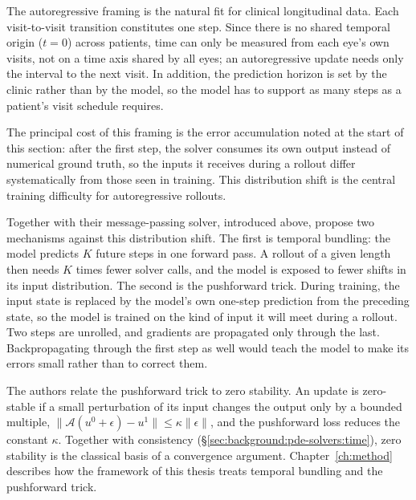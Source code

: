 The autoregressive framing is the natural fit for clinical
longitudinal data. Each visit-to-visit transition constitutes one step. Since there is no
shared temporal origin ($t = 0$) across patients, time can only be
measured from each eye's own visits, not on a time axis shared by all
eyes; an autoregressive update needs only the interval to the next visit.
In addition, the prediction horizon
is set by the clinic rather than by the model, so the model has to
support as many steps as a patient's visit schedule requires.

The principal cost of this framing is the error accumulation noted at
the start of this section: after the first step, the solver consumes its
own output instead of numerical ground truth, so the inputs it receives
during a rollout differ systematically from those seen in training. This
distribution shift is the central training
difficulty for autoregressive rollouts.

Together with their message-passing solver, introduced above,
\citet{Brandstetter2022} propose two mechanisms against this distribution
shift.
The first is temporal bundling: the model predicts $K$ future steps in
one forward pass. A rollout of a given length then needs $K$ times fewer
solver calls, and the model is exposed to fewer shifts in its input
distribution. The second is the pushforward trick. During training, the
input state is replaced by the model's own one-step prediction from the
preceding state, so the model is trained on the kind of input it will
meet during a rollout. Two steps are unrolled, and gradients are
propagated only through the last. Backpropagating through the first step
as well would teach the model to make its errors small rather than to
correct them.

The authors relate the pushforward trick to zero stability. An update
is zero-stable if a small perturbation of its input changes the
output only by a bounded multiple,
$\lVert \mathcal{A}(u^0 + \epsilon) - u^1 \rVert \leq \kappa \lVert
\epsilon \rVert$, and the pushforward loss reduces the constant
$\kappa$. Together with consistency
(\S\ref{sec:background:pde-solvers:time}), zero stability is the
classical basis of a convergence argument. Chapter~\ref{ch:method}
describes how the framework of this thesis treats temporal bundling and
the pushforward trick.


